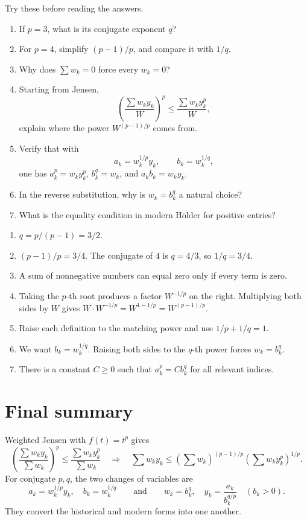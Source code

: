 \documentclass[11pt]{article}
\begin{document}
Try these before reading the answers.

\begin{enumerate}
  \item If \(p=3\), what is its conjugate exponent \(q\)?
  \item For \(p=4\), simplify \((p-1)/p\), and compare it with \(1/q\).
  \item Why does \(\sum w_k=0\) force every \(w_k=0\)?
  \item Starting from Jensen,
  \[
   \left(\frac{\sum w_ky_k}{W}\right)^p
   \leq
   \frac{\sum w_ky_k^p}{W},
  \]
  explain where the power \(W^{(p-1)/p}\) comes from.
  \item Verify that with
  \[
   a_k=w_k^{1/p}y_k,
   \qquad
   b_k=w_k^{1/q},
  \]
  one has \(a_k^p=w_ky_k^p\), \(b_k^q=w_k\), and \(a_kb_k=w_ky_k\).
  \item In the reverse substitution, why is \(w_k=b_k^q\) a natural choice?
  \item What is the equality condition in modern H\"older for positive entries?
\end{enumerate}

\begin{extraBox}[Answers]
\begin{enumerate}
  \item \(q=p/(p-1)=3/2\).
  \item \((p-1)/p=3/4\). The conjugate of \(4\) is \(q=4/3\), so \(1/q=3/4\).
  \item A sum of nonnegative numbers can equal zero only if every term is zero.
  \item Taking the \(p\)-th root produces a factor \(W^{-1/p}\) on the right. Multiplying both sides by \(W\) gives \(W\cdot W^{-1/p}=W^{1-1/p}=W^{(p-1)/p}\).
  \item Raise each definition to the matching power and use \(1/p+1/q=1\).
  \item We want \(b_k=w_k^{1/q}\). Raising both sides to the \(q\)-th power forces \(w_k=b_k^q\).
  \item There is a constant \(C\geq0\) such that \(a_k^p=C b_k^q\) for all relevant indices.
\end{enumerate}
\end{extraBox}

\section{Final summary}

\begin{ideaBox}
\small
Weighted Jensen with \(f(t)=t^p\) gives
\[
 \left(\frac{\sum w_ky_k}{\sum w_k}\right)^p
 \leq
 \frac{\sum w_ky_k^p}{\sum w_k}
 \quad\Longrightarrow\quad
 \sum w_ky_k
 \leq
 \left(\sum w_k\right)^{(p-1)/p}
 \left(\sum w_ky_k^p\right)^{1/p}.
\]
For conjugate \(p,q\), the two changes of variables are
\[
 \boxed{a_k=w_k^{1/p}y_k,\quad b_k=w_k^{1/q}}
 \qquad\text{and}\qquad
 \boxed{w_k=b_k^q,\quad y_k=\frac{a_k}{b_k^{q/p}}}\quad(b_k>0).
\]
They convert the historical and modern forms into one another.
\end{ideaBox}
\end{document}
